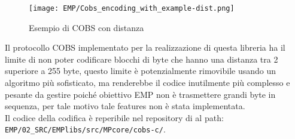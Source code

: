 \begin{figure}[H]
	\centering
	\caption[Esempio di COBS con distanza]{Esempio di COBS con distanza}
	\vspace{1mm}
	\texttt{[image: EMP/Cobs\_encoding\_with\_example-dist.png]}
\end{figure}
\noindent
Il protocollo COBS implementato per la realizzazione di questa libreria ha il limite di non poter codificare blocchi di byte che hanno una distanza tra 2 \zeroByte superiore a 255 byte, questo limite è potenzialmente rimovibile usando un algoritmo più sofisticato, ma renderebbe il codice inutilmente più complesso e pesante da gestire poiché obiettivo EMP non è trasmettere grandi byte in sequenza, per tale motivo tale features non è stata implementata.\\
Il codice della codifica è reperibile nel repository di \cite*{EMP} al path:\\ \verb*|EMP/02_SRC/EMPlibs/src/MPcore/cobs-c/|.

